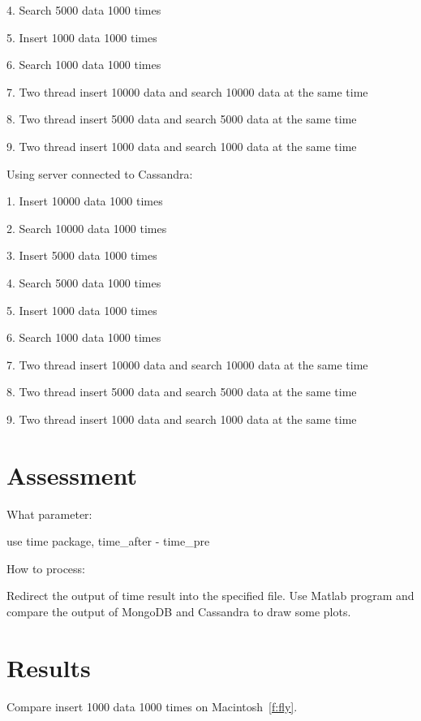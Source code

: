 4. Search 5000 data 1000 times

5. Insert 1000 data 1000 times

6. Search 1000 data 1000 times

7. Two thread insert 10000 data and search 10000 data at the same time

8. Two thread insert 5000 data and search 5000 data at the same time

9. Two thread insert 1000 data and search 1000 data at the same time

Using server connected to Cassandra:

1. Insert 10000 data 1000 times

2. Search 10000 data 1000 times

3. Insert 5000 data 1000 times

4. Search 5000 data 1000 times

5. Insert 1000 data 1000 times

6. Search 1000 data 1000 times

7. Two thread insert 10000 data and search 10000 data at the same time

8. Two thread insert 5000 data and search 5000 data at the same time

9. Two thread insert 1000 data and search 1000 data at the same time

\section{Assessment}
What parameter:

use time package, time\_after - time\_pre 

How to process:

Redirect the output of time result into the specified file. Use Matlab program 
and compare the output of MongoDB and Cassandra to draw some plots. 

\section{Results}
Compare insert 1000 data 1000 times on Macintosh~\ref{f:fly}.

